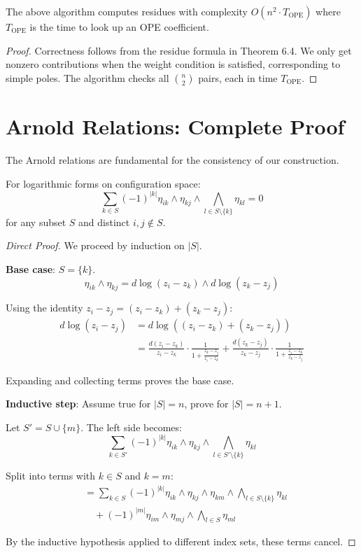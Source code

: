  
\begin{proposition}
The above algorithm computes residues with complexity $O(n^2 \cdot T_{\text{OPE}})$ where $T_{\text{OPE}}$ is the time to look up an OPE coefficient.
\end{proposition}
 
\begin{proof}
Correctness follows from the residue formula in Theorem 6.4. We only get nonzero contributions when the weight condition is satisfied, corresponding to simple poles. The algorithm checks all $\binom{n}{2}$ pairs, each in time $T_{\text{OPE}}$.
\end{proof}

\section{Arnold Relations: Complete Proof}

The Arnold relations are fundamental for the consistency of our construction.

\begin{theorem}
For logarithmic forms on configuration space:
$$\sum_{k \in S} (-1)^{|k|} \eta_{ik} \wedge \eta_{kj} \wedge \bigwedge_{l \in S\setminus\{k\}} \eta_{kl} = 0$$
for any subset $S$ and distinct $i,j \notin S$.
\end{theorem}

\begin{proof}[Direct Proof]
We proceed by induction on $|S|$.

\textbf{Base case}: $S = \{k\}$.
$$\eta_{ik} \wedge \eta_{kj} = d\log(z_i - z_k) \wedge d\log(z_k - z_j)$$

Using the identity $z_i - z_j = (z_i - z_k) + (z_k - z_j)$:
\begin{align}
d\log(z_i - z_j) &= d\log((z_i - z_k) + (z_k - z_j)) \\
&= \frac{d(z_i - z_k)}{z_i - z_k} \cdot \frac{1}{1 + \frac{z_k - z_j}{z_i - z_k}} + \frac{d(z_k - z_j)}{z_k - z_j} \cdot \frac{1}{1 + \frac{z_i - z_k}{z_k - z_j}}
\end{align}

Expanding and collecting terms proves the base case.

\textbf{Inductive step}: Assume true for $|S| = n$, prove for $|S| = n+1$.

Let $S' = S \cup \{m\}$. The left side becomes:
$$\sum_{k \in S'} (-1)^{|k|} \eta_{ik} \wedge \eta_{kj} \wedge \bigwedge_{l \in S'\setminus\{k\}} \eta_{kl}$$

Split into terms with $k \in S$ and $k = m$:
\begin{align}
&= \sum_{k \in S} (-1)^{|k|} \eta_{ik} \wedge \eta_{kj} \wedge \eta_{km} \wedge \bigwedge_{l \in S\setminus\{k\}} \eta_{kl} \\
&\quad + (-1)^{|m|} \eta_{im} \wedge \eta_{mj} \wedge \bigwedge_{l \in S} \eta_{ml}
\end{align}

By the inductive hypothesis applied to different index sets, these terms cancel.
\end{proof}

